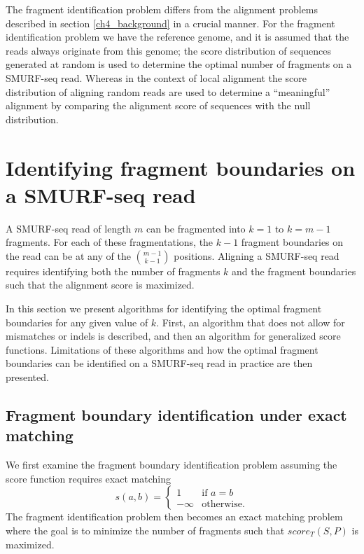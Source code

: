 The fragment identification problem differs from the alignment problems
described in section \ref{ch4_background} in a crucial manner. For the
fragment identification problem we have the reference genome, and it is
assumed that the reads always originate from this genome; the score
distribution of sequences generated at random is used to determine the
optimal number of fragments on a SMURF-seq read. Whereas in the context
of local alignment the score distribution of aligning random reads are
used to determine a ``meaningful'' alignment by comparing the alignment
score of sequences with the null distribution.



\section{Identifying fragment boundaries on a SMURF-seq read}
\label{frag_bound_id}
A SMURF-seq read of length $m$ can be fragmented into $k=1$ to $k=m-1$
fragments. For each of these fragmentations, the $k-1$ fragment
boundaries on the read can be at any of the $m-1 \choose k-1$ positions.
Aligning a SMURF-seq read requires identifying both the number of
fragments $k$ and the fragment boundaries such that the alignment score
is maximized.

In this section we present algorithms for identifying the optimal
fragment boundaries for any given value of $k$. First, an algorithm that
does not allow for mismatches or indels is described, and then an
algorithm for generalized score functions. Limitations of these
algorithms and how the optimal fragment boundaries can be identified on
a SMURF-seq read in practice are then presented.

\subsection{Fragment boundary identification under exact matching}
We first examine the fragment boundary identification problem assuming
the score function requires exact matching
\[s(a,b)=
\begin{cases}
  1 & \text{if } a = b \\
  -\infty & \text{otherwise.}
\end{cases}\]
The fragment identification problem then becomes an exact matching
problem where the goal is to minimize the number of fragments such that
$score_T(S,P)$ is maximized.

